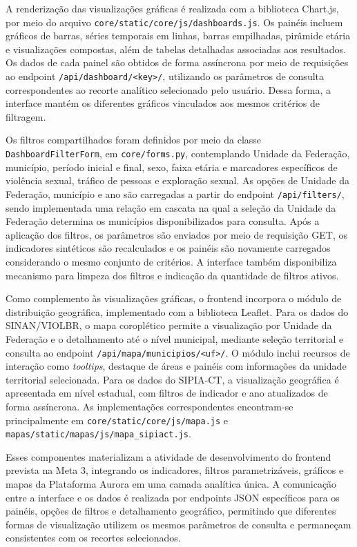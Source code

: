 \documentclass[11pt,a4paper]{article}
\begin{document}
A renderização das visualizações gráficas é realizada com a biblioteca Chart.js, por meio do arquivo \texttt{core/static/core/js/dashboards.js}. Os painéis incluem gráficos de barras, séries temporais em linhas, barras empilhadas, pirâmide etária e visualizações compostas, além de tabelas detalhadas associadas aos resultados. Os dados de cada painel são obtidos de forma assíncrona por meio de requisições ao endpoint \texttt{/api/dashboard/<key>/}, utilizando os parâmetros de consulta correspondentes ao recorte analítico selecionado pelo usuário. Dessa forma, a interface mantém os diferentes gráficos vinculados aos mesmos critérios de filtragem.

Os filtros compartilhados foram definidos por meio da classe \texttt{DashboardFilterForm}, em \texttt{core/forms.py}, contemplando Unidade da Federação, município, período inicial e final, sexo, faixa etária e marcadores específicos de violência sexual, tráfico de pessoas e exploração sexual. As opções de Unidade da Federação, município e ano são carregadas a partir do endpoint \texttt{/api/filters/}, sendo implementada uma relação em cascata na qual a seleção da Unidade da Federação determina os municípios disponibilizados para consulta. Após a aplicação dos filtros, os parâmetros são enviados por meio de requisição GET, os indicadores sintéticos são recalculados e os painéis são novamente carregados considerando o mesmo conjunto de critérios. A interface também disponibiliza mecanismo para limpeza dos filtros e indicação da quantidade de filtros ativos.

Como complemento às visualizações gráficas, o frontend incorpora o módulo de distribuição geográfica, implementado com a biblioteca Leaflet. Para os dados do SINAN/VIOLBR, o mapa coroplético permite a visualização por Unidade da Federação e o detalhamento até o nível municipal, mediante seleção territorial e consulta ao endpoint \texttt{/api/mapa/municipios/<uf>/}. O módulo inclui recursos de interação como \textit{tooltips}, destaque de áreas e painéis com informações da unidade territorial selecionada. Para os dados do SIPIA-CT, a visualização geográfica é apresentada em nível estadual, com filtros de indicador e ano atualizados de forma assíncrona. As implementações correspondentes encontram-se principalmente em \texttt{core/static/core/js/mapa.js} e \texttt{mapas/static/mapas/js/mapa\_sipiact.js}.

Esses componentes materializam a atividade de desenvolvimento do frontend prevista na Meta 3, integrando os indicadores, filtros parametrizáveis, gráficos e mapas da Plataforma Aurora em uma camada analítica única. A comunicação entre a interface e os dados é realizada por endpoints JSON específicos para os painéis, opções de filtros e detalhamento geográfico, permitindo que diferentes formas de visualização utilizem os mesmos parâmetros de consulta e permaneçam consistentes com os recortes selecionados.
\end{document}
